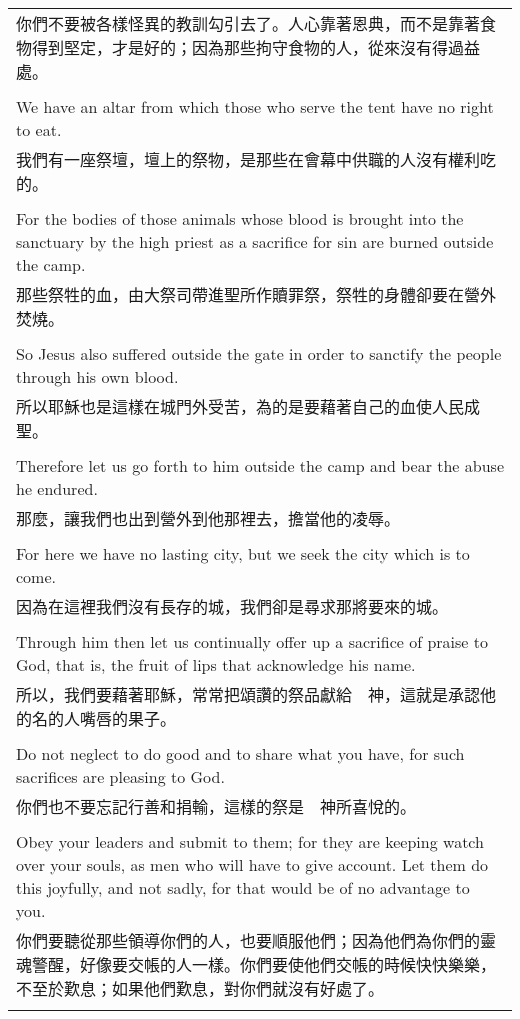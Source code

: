 \documentclass{book}
\begin{document}
\begin{tabularx}{\textwidth}{p{}}
你們不要被各樣怪異的教訓勾引去了。人心靠著恩典，而不是靠著食物得到堅定，才是好的；因為那些拘守食物的人，從來沒有得過益處。 \\ \\
We have an altar from which those who serve the tent have no right to eat. \\
我們有一座祭壇，壇上的祭物，是那些在會幕中供職的人沒有權利吃的。 \\ \\
For the bodies of those animals whose blood is brought into the sanctuary by the high priest as a sacrifice for sin are burned outside the camp. \\
那些祭牲的血，由大祭司帶進聖所作贖罪祭，祭牲的身體卻要在營外焚燒。 \\ \\
So Jesus also suffered outside the gate in order to sanctify the people through his own blood. \\
所以耶穌也是這樣在城門外受苦，為的是要藉著自己的血使人民成聖。 \\ \\
Therefore let us go forth to him outside the camp and bear the abuse he endured. \\
那麼，讓我們也出到營外到他那裡去，擔當他的凌辱。 \\ \\
For here we have no lasting city, but we seek the city which is to come. \\
因為在這裡我們沒有長存的城，我們卻是尋求那將要來的城。 \\ \\
Through him then let us continually offer up a sacrifice of praise to God, that is, the fruit of lips that acknowledge his name. \\
所以，我們要藉著耶穌，常常把頌讚的祭品獻給　神，這就是承認他的名的人嘴唇的果子。 \\ \\
Do not neglect to do good and to share what you have, for such sacrifices are pleasing to God. \\
你們也不要忘記行善和捐輸，這樣的祭是　神所喜悅的。 \\ \\
Obey your leaders and submit to them; for they are keeping watch over your souls, as men who will have to give account. Let them do this joyfully, and not sadly, for that would be of no advantage to you. \\
你們要聽從那些領導你們的人，也要順服他們；因為他們為你們的靈魂警醒，好像要交帳的人一樣。你們要使他們交帳的時候快快樂樂，不至於歎息；如果他們歎息，對你們就沒有好處了。 \\ \\

\hline
\end{tabularx}
\end{document}
